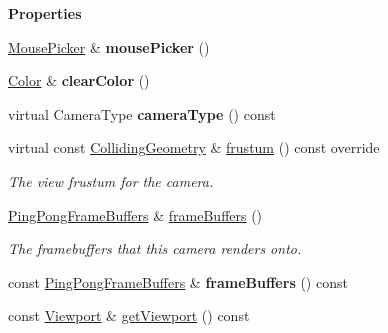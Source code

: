 \begin{Indent}\textbf{ Properties}\par
\begin{DoxyCompactItemize}
\item 
\mbox{\label{classrev_1_1_camera_a7c20df11693397f984308bdb14163764}} 
\mbox{\hyperlink{classrev_1_1_mouse_picker}{Mouse\+Picker}} \& {\bfseries mouse\+Picker} ()
\item 
\mbox{\label{classrev_1_1_camera_a6248b4c21c2ad239d23f6910a294d62f}} 
\mbox{\hyperlink{classrev_1_1_color}{Color}} \& {\bfseries clear\+Color} ()
\item 
\mbox{\label{classrev_1_1_camera_a83318e2ca8d87019114a483b6d987769}} 
virtual Camera\+Type {\bfseries camera\+Type} () const
\item 
\mbox{\label{classrev_1_1_camera_afc7ce1c13f50a84a2d858913a65b4cd8}} 
virtual const \mbox{\hyperlink{classrev_1_1_colliding_geometry}{Colliding\+Geometry}} \& \mbox{\hyperlink{classrev_1_1_camera_afc7ce1c13f50a84a2d858913a65b4cd8}{frustum}} () const override
\begin{DoxyCompactList}\small\item\em The view frustum for the camera. \end{DoxyCompactList}\item 
\mbox{\hyperlink{classrev_1_1_frame_buffer_queue}{Ping\+Pong\+Frame\+Buffers}} \& \mbox{\hyperlink{classrev_1_1_camera_aa594d44b9d0e70e9bf806477ed6ed962}{frame\+Buffers}} ()
\begin{DoxyCompactList}\small\item\em The framebuffers that this camera renders onto. \end{DoxyCompactList}\item 
\mbox{\label{classrev_1_1_camera_ac8a2ec1b6903ec99db659219a83cf435}} 
const \mbox{\hyperlink{classrev_1_1_frame_buffer_queue}{Ping\+Pong\+Frame\+Buffers}} \& {\bfseries frame\+Buffers} () const
\item 
\mbox{\label{classrev_1_1_camera_a1b9a615be159687459a298349e5be4c1}} 
const \mbox{\hyperlink{classrev_1_1_viewport}{Viewport}} \& \mbox{\hyperlink{classrev_1_1_camera_a1b9a615be159687459a298349e5be4c1}{get\+Viewport}} () const

\end{DoxyCompactItemize}
\end{Indent}
